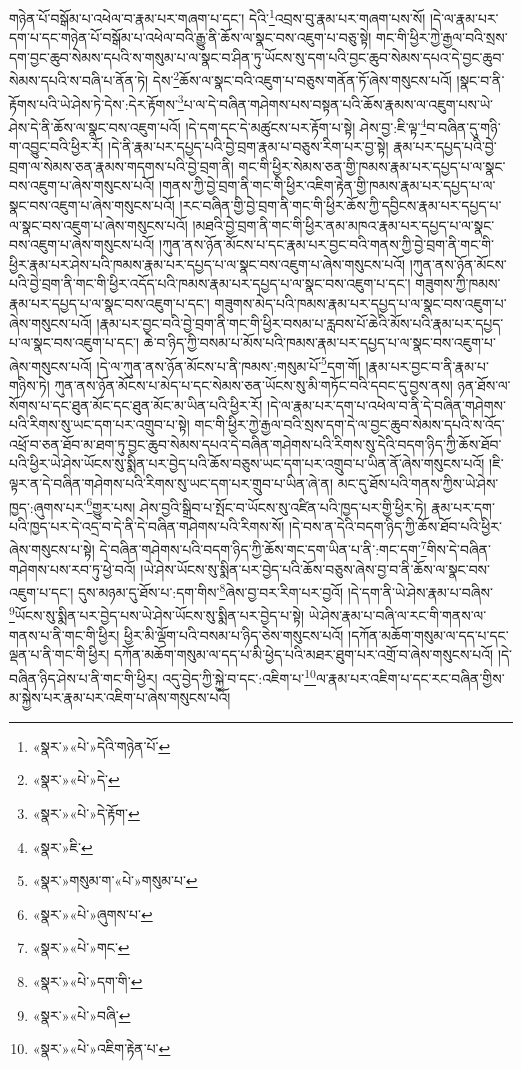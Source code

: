 གཉེན་པོ་བསྒོམ་པ་འཕེལ་བ་རྣམ་པར་གཞག་པ་དང་། དེའི་\footnote{«སྣར་»«པེ་»དེའི་གཉེན་པོ་}འབྲས་བུ་རྣམ་པར་གཞག་པས་སོ། །དེ་ལ་རྣམ་པར་དག་པ་དང་གཉེན་པོ་བསྒོམ་པ་འཕེལ་བའི་རྒྱུ་ནི་ཆོས་ལ་སྣང་བས་འཇུག་པ་བཅུ་སྟེ། གང་གི་ཕྱིར་ཀྱེ་རྒྱལ་བའི་སྲས་དག་བྱང་ཆུབ་སེམས་དཔའི་ས་གསུམ་པ་ལ་སྣང་བ་ཤིན་ཏུ་ཡོངས་སུ་དག་པའི་བྱང་ཆུབ་སེམས་དཔའ་དེ་བྱང་ཆུབ་སེམས་དཔའི་ས་བཞི་པ་ནོན་ཏེ། དེས་\footnote{«སྣར་»«པེ་»དེ་}ཆོས་ལ་སྣང་བའི་འཇུག་པ་བཅུས་གནོན་ཏོ་ཞེས་གསུངས་པའོ། །སྣང་བ་ནི་རྟོགས་པའི་ཡེ་ཤེས་ཏེ་དེས་:དེར་རྟོགས་\footnote{«སྣར་»«པེ་»དེ་རྟོག་}པ་ལ་དེ་བཞིན་གཤེགས་པས་བསྟན་པའི་ཆོས་རྣམས་ལ་འཇུག་པས་ཡེ་ཤེས་དེ་ནི་ཆོས་ལ་སྣང་བས་འཇུག་པའོ། །དེ་དག་དང་དེ་མཚུངས་པར་རྟོག་པ་སྟེ། ཤེས་བྱ་:ཇི་ལྟ་\footnote{«སྣར་»ཇི་}བ་བཞིན་དུ་གཉི་ག་འབྱུང་བའི་ཕྱིར་རོ། །དེ་ནི་རྣམ་པར་དཔྱད་པའི་བྱེ་བྲག་རྣམ་པ་བཅུས་རིག་པར་བྱ་སྟེ། རྣམ་པར་དཔྱད་པའི་བྱེ་བྲག་ལ་སེམས་ཅན་རྣམས་གདགས་པའི་བྱེ་བྲག་ནི། གང་གི་ཕྱིར་སེམས་ཅན་གྱི་ཁམས་རྣམ་པར་དཔྱད་པ་ལ་སྣང་བས་འཇུག་པ་ཞེས་གསུངས་པའོ། །གནས་ཀྱི་བྱེ་བྲག་ནི་གང་གི་ཕྱིར་འཇིག་རྟེན་གྱི་ཁམས་རྣམ་པར་དཔྱད་པ་ལ་སྣང་བས་འཇུག་པ་ཞེས་གསུངས་པའོ། །རང་བཞིན་གྱི་བྱེ་བྲག་ནི་གང་གི་ཕྱིར་ཆོས་ཀྱི་དབྱིངས་རྣམ་པར་དཔྱད་པ་ལ་སྣང་བས་འཇུག་པ་ཞེས་གསུངས་པའོ། །མཐའི་བྱེ་བྲག་ནི་གང་གི་ཕྱིར་ནམ་མཁའ་རྣམ་པར་དཔྱད་པ་ལ་སྣང་བས་འཇུག་པ་ཞེས་གསུངས་པའོ། །ཀུན་ནས་ཉོན་མོངས་པ་དང་རྣམ་པར་བྱང་བའི་གནས་ཀྱི་བྱེ་བྲག་ནི་གང་གི་ཕྱིར་རྣམ་པར་ཤེས་པའི་ཁམས་རྣམ་པར་དཔྱད་པ་ལ་སྣང་བས་འཇུག་པ་ཞེས་གསུངས་པའོ། །ཀུན་ནས་ཉོན་མོངས་པའི་བྱེ་བྲག་ནི་གང་གི་ཕྱིར་འདོད་པའི་ཁམས་རྣམ་པར་དཔྱད་པ་ལ་སྣང་བས་འཇུག་པ་དང་། གཟུགས་ཀྱི་ཁམས་རྣམ་པར་དཔྱད་པ་ལ་སྣང་བས་འཇུག་པ་དང་། གཟུགས་མེད་པའི་ཁམས་རྣམ་པར་དཔྱད་པ་ལ་སྣང་བས་འཇུག་པ་ཞེས་གསུངས་པའོ། །རྣམ་པར་བྱང་བའི་བྱེ་བྲག་ནི་གང་གི་ཕྱིར་བསམ་པ་རླབས་པོ་ཆེའི་མོས་པའི་རྣམ་པར་དཔྱད་པ་ལ་སྣང་བས་འཇུག་པ་དང་། ཆེ་བ་ཉིད་ཀྱི་བསམ་པ་མོས་པའི་ཁམས་རྣམ་པར་དཔྱད་པ་ལ་སྣང་བས་འཇུག་པ་ཞེས་གསུངས་པའོ། །དེ་ལ་ཀུན་ནས་ཉོན་མོངས་པ་ནི་ཁམས་:གསུམ་པོ་\footnote{«སྣར་»གསུམ་ག་«པེ་»གསུམ་པ་}དག་གོ། །རྣམ་པར་བྱང་བ་ནི་རྣམ་པ་གཉིས་ཏེ། ཀུན་ནས་ཉོན་མོངས་པ་མེད་པ་དང་སེམས་ཅན་ཡོངས་སུ་མི་གཏོང་བའི་དབང་དུ་བྱས་ནས། ཉན་ཐོས་ལ་སོགས་པ་དང་ཐུན་མོང་དང་ཐུན་མོང་མ་ཡིན་པའི་ཕྱིར་རོ། །དེ་ལ་རྣམ་པར་དག་པ་འཕེལ་བ་ནི་དེ་བཞིན་གཤེགས་པའི་རིགས་སུ་ཡང་དག་པར་འགྲུབ་པ་སྟེ། གང་གི་ཕྱིར་ཀྱེ་རྒྱལ་བའི་སྲས་དག་དེ་ལ་བྱང་ཆུབ་སེམས་དཔའི་ས་འོད་འཕྲོ་བ་ཅན་ཐོབ་མ་ཐག་ཏུ་བྱང་ཆུབ་སེམས་དཔའ་དེ་བཞིན་གཤེགས་པའི་རིགས་སུ་དེའི་བདག་ཉིད་ཀྱི་ཆོས་ཐོབ་པའི་ཕྱིར་ཡེ་ཤེས་ཡོངས་སུ་སྨིན་པར་བྱེད་པའི་ཆོས་བཅུས་ཡང་དག་པར་འགྲུབ་པ་ཡིན་ནོ་ཞེས་གསུངས་པའོ། །ཇི་ལྟར་ན་དེ་བཞིན་གཤེགས་པའི་རིགས་སུ་ཡང་དག་པར་གྲུབ་པ་ཡིན་ཞེ་ན། མང་དུ་ཐོས་པའི་གནས་ཀྱིས་ཡེ་ཤེས་ཁྱད་:ཞུགས་པར་\footnote{«སྣར་»«པེ་»ཞུགས་པ་}གྱུར་པས། ཤེས་བྱའི་སྒྲིབ་པ་སྤོང་བ་ཡོངས་སུ་འཛིན་པའི་ཁྱད་པར་གྱི་ཕྱིར་ཏེ། རྣམ་པར་དག་པའི་ཁྱད་པར་དེ་འདྲ་བ་དེ་ནི་དེ་བཞིན་གཤེགས་པའི་རིགས་སོ། །དེ་བས་ན་དེའི་བདག་ཉིད་ཀྱི་ཆོས་ཐོབ་པའི་ཕྱིར་ཞེས་གསུངས་པ་སྟེ། དེ་བཞིན་གཤེགས་པའི་བདག་ཉིད་ཀྱི་ཆོས་གང་དག་ཡིན་པ་ནི་:གང་དག་\footnote{«སྣར་»«པེ་»གང་}གིས་དེ་བཞིན་གཤེགས་པས་རབ་ཏུ་ཕྱེ་བའོ། །ཡེ་ཤེས་ཡོངས་སུ་སྨིན་པར་བྱེད་པའི་ཆོས་བཅུས་ཞེས་བྱ་བ་ནི་ཆོས་ལ་སྣང་བས་འཇུག་པ་དང་། དུས་མཉམ་དུ་ཐོས་པ་:དག་གིས་\footnote{«སྣར་»«པེ་»དག་གི་}ཞེས་བྱ་བར་རིག་པར་བྱའོ། །དེ་དག་ནི་ཡེ་ཤེས་རྣམ་པ་བཞིས་\footnote{«སྣར་»«པེ་»བཞི་}ཡོངས་སུ་སྨིན་པར་བྱེད་པས་ཡེ་ཤེས་ཡོངས་སུ་སྨིན་པར་བྱེད་པ་སྟེ། ཡེ་ཤེས་རྣམ་པ་བཞི་ལ་རང་གི་གནས་ལ་གནས་པ་ནི་གང་གི་ཕྱིར། ཕྱིར་མི་ལྡོག་པའི་བསམ་པ་ཉིད་ཅེས་གསུངས་པའོ། །དཀོན་མཆོག་གསུམ་ལ་དད་པ་དང་ལྡན་པ་ནི་གང་གི་ཕྱིར། དཀོན་མཆོག་གསུམ་ལ་དད་པ་མི་ཕྱེད་པའི་མཐར་ཐུག་པར་འགྲོ་བ་ཞེས་གསུངས་པའོ། །དེ་བཞིན་ཉིད་ཤེས་པ་ནི་གང་གི་ཕྱིར། འདུ་བྱེད་ཀྱི་སྐྱེ་བ་དང་:འཇིག་པ་\footnote{«སྣར་»«པེ་»འཇིག་རྟེན་པ་}ལ་རྣམ་པར་འཇིག་པ་དང་རང་བཞིན་གྱིས་མ་སྐྱེས་པར་རྣམ་པར་འཇིག་པ་ཞེས་གསུངས་པའོ། 